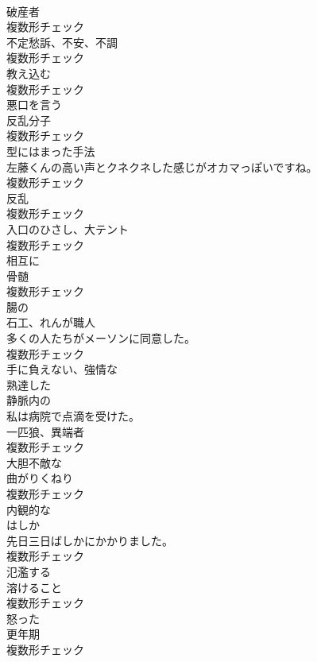 \documentclass[8pt]{extreport}
\begin{document}
\begin{CJK}{UTF8}{min}
\\	[名詞]	破産者	
\\	複数形チェック
\\	[名詞]	不定愁訴、不安、不調	
\\	複数形チェック
\\	[名詞]	教え込む	
\\	複数形チェック
\\	[動詞]	悪口を言う	
\\	[名詞]	反乱分子	
\\	複数形チェック
\\	[名詞]	型にはまった手法	
\\	左藤くんの高い声とクネクネした感じがオカマっぽいですね。	
\\	複数形チェック
\\	[名詞]	反乱	
\\	複数形チェック
\\	[名詞]	入口のひさし、大テント	
\\	複数形チェック
\\	[前置詞]	相互に	
\\	[名詞]	骨髄	
\\	複数形チェック
\\	[形容詞]	腸の	
\\	[名詞]	石工、れんが職人	
\\	多くの人たちがメーソンに同意した。	
\\	複数形チェック
\\	[形容詞]	手に負えない、強情な	
\\	[形容詞]	熟達した	
\\	[形容詞]	静脈内の	
\\	私は病院で点滴を受けた。	
\\	[名詞]	一匹狼、異端者	
\\	複数形チェック
\\	[形容詞]	大胆不敵な	
\\	[名詞]	曲がりくねり	
\\	複数形チェック
\\	[形容詞]	内観的な	
\\	[名詞]	はしか	
\\	先日三日ばしかにかかりました。	
\\	複数形チェック
\\	[動詞]	氾濫する	
\\	[名詞]	溶けること	
\\	複数形チェック
\\	[形容詞]	怒った	
\\	[名詞]	更年期	
\\	複数形チェック

\end{CJK}
\end{document}
